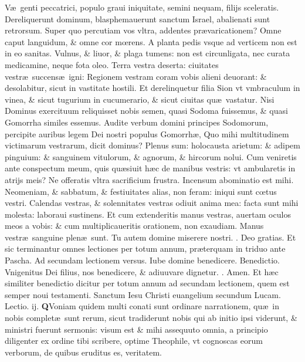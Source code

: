 \documentclass[a5paper,10pt]{book}
\makeatletter
\DeclareRobustCommand{\Rbar}{\vers@resp{0pt}{R}}
\newcommand{\vers@resp@sym}{\raisebox{0.2ex}{\rotatebox[origin=c]{-20}{$\m@th\rceil$}}}
\newcommand{\vers@resp}[2]{%
  {\ooalign{\hidewidth\kern#1\vers@resp@sym\hidewidth\cr#2\cr}}%
}%
\def\ae{æ}
\def\oe{œ}
\makeatother
\begin{document}
\begin{multicols*}{2}
V\ae \ genti peccatrici, populo graui iniquitate, semini nequam, filijs sceleratis.
Dereliquerunt dominum, blasphemauerunt sanctum Israel, abalienati sunt retrorsum. 
Super quo percutiam vos vltra, addentes pr\ae varicationem?
Omne caput languidum, \& omne cor m\oe rens.
A planta pedis vsque ad verticem non est in eo sanitas.
Vulnus, \& liuor, \& plaga tumens: non est circunligata, nec curata medicamine, neque fota oleo.
Terra vestra deserta: ciuitates vestr\ae \ succens\ae \ igni: Regionem vestram coram vobis alieni deuorant: \& desolabitur, sicut in vastitate hostili. 
Et derelinquetur filia Sion vt vmbraculum in vinea, \& sicut tugurium in cucumerario, \& sicut ciuitas qu\ae \ vastatur.
Nisi Dominus exercituum reliquisset nobis semen, quasi Sodoma fuissemus, \& quasi Gomorrha similes essemus.
Audite verbum domini principes Sodomorum, percipite auribus legem Dei nostri populus Gomorrh\ae , Quo mihi multitudinem victimarum vestrarum, dicit dominus?
Plenus sum: holocausta arietum: \& adipem pinguium: \& sanguinem vitulorum, \& agnorum, \& hircorum nolui.
Cum veniretis ante conspectum meum, quis qu\ae siuit h\ae c de manibus vestris: vt ambularetis in atrijs meis?
Ne offeratis vltra sacrificium frustra.
Incensum abominatio est mihi.
Neomeniam, \& sabbatum, \& festiuitates alias, non feram: iniqui sunt c\oe tus vestri.
Calendas vestras, \& solennitates vestras odiuit anima mea: facta sunt mihi molesta: laboraui sustinens.
Et cum extenderitis manus vestras, auertam oculos meos a vobis: \& cum multiplicaueritis orationem, non exaudiam.
Manus vestr\ae \ sanguine plen\ae \ sunt.%
\newline Tu autem domine miserere nostri. \color{red} \Rbar . \color{black} Deo gratias.
\color{red} Et sic terminantur omnes lectiones per totum annum, pr\ae terquam in triduo ante Pascha. Ad secundam lectionem versus. \color{black} Iube domine benedicere. \color{red} Benedictio. \color{black} Vnigenitus Dei filius, nos benedicere, \& adiuuvare dignetur. \color{red} \Rbar . \color{black} Amen.
\newline \color{red} Et h\ae c similiter benedictio dicitur per totum annum ad secundam lectionem, quem est semper noui testamenti. Sanctum Iesu Christi euangelium secundum Lucam. Lectio. ij. \color{black}
\vspace{-2em}
\lettrine[lines=2]{\bfseries \color{red} Q}{}Voniam quidem multi conati sunt ordinare narrationem, qu\ae \ in nobis complet\ae \ sunt rerum, sicut tradiderunt nobis qui ab initio ipsi viderunt, \& ministri fuerunt sermonis: visum est \& mihi assequuto omnia, a principio diligenter ex ordine tibi scribere, optime Theophile, vt cognoscas eorum verborum, de quibus eruditus es, veritatem. \textdagger \ 

\end{multicols*}
\end{document}

